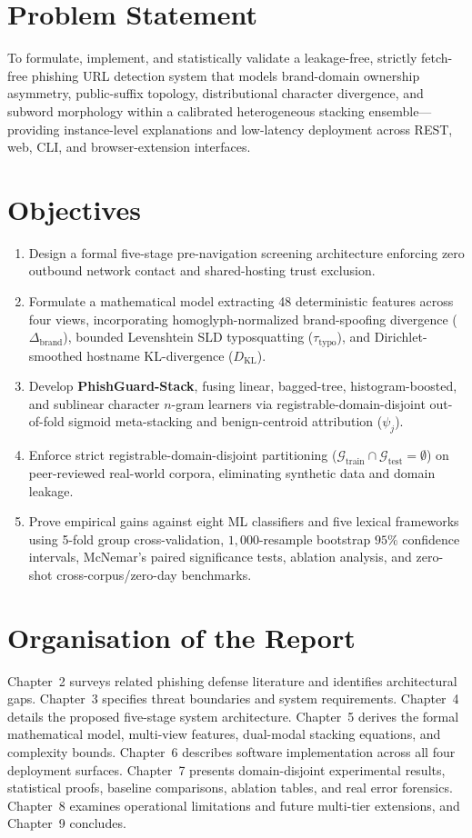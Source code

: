 \documentclass[12pt,a4paper]{report}
\begin{document}
\section{Problem Statement}
To formulate, implement, and statistically validate a leakage-free, strictly fetch-free phishing URL detection system that models brand-domain ownership asymmetry, public-suffix topology, distributional character divergence, and subword morphology within a calibrated heterogeneous stacking ensemble---providing instance-level explanations and low-latency deployment across REST, web, CLI, and browser-extension interfaces.

\section{Objectives}
\begin{enumerate}
\item Design a formal five-stage pre-navigation screening architecture enforcing zero outbound network contact and shared-hosting trust exclusion.
\item Formulate a mathematical model extracting 48 deterministic features across four views, incorporating homoglyph-normalized brand-spoofing divergence ($\Delta_{\text{brand}}$), bounded Levenshtein SLD typosquatting ($\tau_{\text{typo}}$), and Dirichlet-smoothed hostname KL-divergence ($D_{\text{KL}}$).
\item Develop \textbf{PhishGuard-Stack}, fusing linear, bagged-tree, histogram-boosted, and sublinear character $n$-gram learners via registrable-domain-disjoint out-of-fold sigmoid meta-stacking and benign-centroid attribution ($\psi_j$).
\item Enforce strict registrable-domain-disjoint partitioning ($\mathcal{G}_{\text{train}} \cap \mathcal{G}_{\text{test}} = \emptyset$) on peer-reviewed real-world corpora, eliminating synthetic data and domain leakage.
\item Prove empirical gains against eight ML classifiers and five lexical frameworks using 5-fold group cross-validation, $1{,}000$-resample bootstrap $95\%$ confidence intervals, McNemar's paired significance tests, ablation analysis, and zero-shot cross-corpus/zero-day benchmarks.
\end{enumerate}

\section{Organisation of the Report}
Chapter~2 surveys related phishing defense literature and identifies architectural gaps. Chapter~3 specifies threat boundaries and system requirements. Chapter~4 details the proposed five-stage system architecture. Chapter~5 derives the formal mathematical model, multi-view features, dual-modal stacking equations, and complexity bounds. Chapter~6 describes software implementation across all four deployment surfaces. Chapter~7 presents domain-disjoint experimental results, statistical proofs, baseline comparisons, ablation tables, and real error forensics. Chapter~8 examines operational limitations and future multi-tier extensions, and Chapter~9 concludes.
\end{document}
